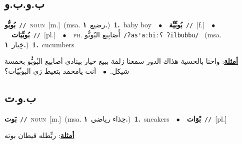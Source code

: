 \documentclass[10pt,a4paper,twoside]{article} %
\begin{document}
\begin{multicols}{2}
\vspace{-3mm}
\subsection*{\color{blue}\foreignlanguage{arabic}{ب.و.ب.و}\color{blue}{ (ntws)}} 

{\setlength\topsep{0pt}\textbf{\foreignlanguage{arabic}{بُوبُّو}}\ {\color{gray}\texttt{//}\color{black}}\ \textsc{noun}\ [m.]\ \color{gray}(msa. \foreignlanguage{arabic}{رضيع}~\foreignlanguage{arabic}{\textbf{١.}})\color{black}\ \textbf{1.}~baby boy\ \ $\bullet$\ \ \setlength\topsep{0pt}\textbf{\foreignlanguage{arabic}{بُوبِّيِّة}}\ {\color{gray}\texttt{//}\color{black}}\ [f.]\ \ $\bullet$\ \ \setlength\topsep{0pt}\textbf{\foreignlanguage{arabic}{بُوبِّيَات}}\ {\color{gray}\texttt{//}\color{black}}\ [pl.]\ \ $\bullet$\ \ \textsc{ph.} \color{gray} \foreignlanguage{arabic}{أَصَابِيع البُوبُّو}\color{black}\ {\color{gray}\texttt{/{\sffamily ʔasˤaːbiːʕ ʔilbubbu}/}\color{black}}\ \color{gray} (msa. \foreignlanguage{arabic}{خِيار}~\foreignlanguage{arabic}{\textbf{١.}})\color{black}\ \textbf{1.}~cucumbers\  \begin{flushright}\color{gray}\foreignlanguage{arabic}{\textbf{\underline{\foreignlanguage{arabic}{أمثلة}}}: واحنا بالحسية هذاك الدور سمعنا زلمة ببيع خيار بينادي أصابيع البُوبُّو بخمسة شيكل.\ $\bullet$\ \  أنت يامحمد بتعيط زي البوبِّيّات؟}\end{flushright}\color{black}} \vspace{2mm}

\vspace{-3mm}
\subsection*{\color{blue}\foreignlanguage{arabic}{ب.و.ت}\color{blue}{ (ntws)}} 

{\setlength\topsep{0pt}\textbf{\foreignlanguage{arabic}{بَوت}}\ {\color{gray}\texttt{//}\color{black}}\ \textsc{noun}\ [m.]\ \color{gray}(msa. \foreignlanguage{arabic}{حِذاء رياضي}~\foreignlanguage{arabic}{\textbf{١.}})\color{black}\ \textbf{1.}~sneakers\ \ $\bullet$\ \ \setlength\topsep{0pt}\textbf{\foreignlanguage{arabic}{بْوَات}}\ {\color{gray}\texttt{//}\color{black}}\ [pl.]\  \begin{flushright}\color{gray}\foreignlanguage{arabic}{\textbf{\underline{\foreignlanguage{arabic}{أمثلة}}}: ربِّطله قيطان بوته}\end{flushright}\color{black}} \vspace{2mm}


\end{multicols}
\end{document}
